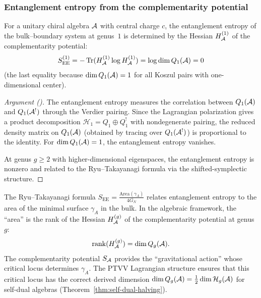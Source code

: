 \subsubsection{Entanglement entropy from the complementarity
potential}
\label{subsubsec:thqg-III-entanglement}

\begin{proposition}
\label{prop:thqg-III-entanglement-entropy}
For a unitary chiral algebra $\mathcal{A}$ with central charge $c$,
the entanglement entropy of the bulk--boundary system at genus~$1$
is determined by the Hessian $H_{\mathcal{A}}^{(1)}$ of the
complementarity potential:
\begin{equation}\label{eq:thqg-III-entanglement}
S_{\mathrm{EE}}^{(1)}
= -\operatorname{Tr}(H_{\mathcal{A}}^{(1)} \log H_{\mathcal{A}}^{(1)})
= \log \dim Q_1(\mathcal{A})
= 0
\end{equation}
\textup{(}the last equality because $\dim Q_1(\mathcal{A}) = 1$
for all Koszul pairs with one-dimensional center\textup{)}.
\end{proposition}

\begin{proof}[Argument \textup{(}\ClaimStatusHeuristic{}\textup{)}]
The entanglement entropy measures the correlation between
$Q_1(\mathcal{A})$ and $Q_1(\mathcal{A}^!)$ through the Verdier pairing.
Since the Lagrangian polarization gives a product
decomposition $\mathcal{H}_1 = Q_1 \oplus Q_1^!$
with nondegenerate pairing, the reduced density matrix on
$Q_1(\mathcal{A})$ (obtained by tracing over $Q_1(\mathcal{A}^!)$) is
proportional to the identity. For
$\dim Q_1(\mathcal{A}) = 1$, the entanglement entropy vanishes.

At genus $g \ge 2$ with higher-dimensional eigenspaces,
the entanglement entropy is nonzero and related to the
Ryu--Takayanagi formula \cite{Ryu-Takayanagi06} via
the shifted-symplectic structure.
\end{proof}

\begin{remark}
\label{rem:thqg-III-ryu-takayanagi}
The Ryu--Takayanagi formula
$S_{\mathrm{EE}} = \frac{\mathrm{Area}(\gamma_A)}{4G_N}$
relates entanglement entropy to the area of the minimal
surface $\gamma_A$ in the bulk. In the algebraic framework,
the ``area'' is the rank of the Hessian $H_{\mathcal{A}}^{(g)}$ of
the complementarity potential at genus $g$:
\[
\operatorname{rank}(H_{\mathcal{A}}^{(g)}) = \dim Q_g(\mathcal{A}).
\]
The complementarity potential $S_{\mathcal{A}}$ provides the
``gravitational action'' whose critical locus determines
$\gamma_A$. The PTVV Lagrangian structure ensures that
this critical locus has the correct derived dimension
$\dim Q_g(\mathcal{A}) = \tfrac{1}{2} \dim \mathcal{H}_g(\mathcal{A})$
for self-dual algebras
(Theorem~\ref{thm:self-dual-halving}).
\end{remark}

